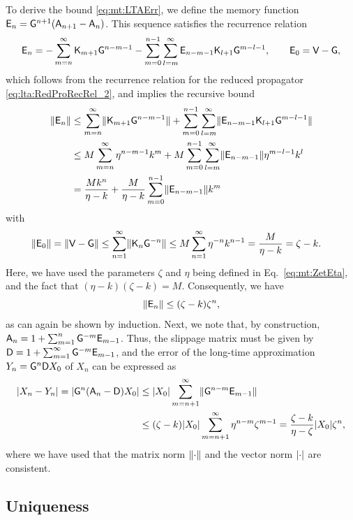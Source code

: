 \documentclass[aps,prl,reprint]{revtex4-2}
\begin{document}
To derive the bound \eqref{eq:mt:LTAErr}, we define the memory function $\mathsf{E}_n = \mathsf{G}^{n+1}(\mathsf{A}_{n+1} -\mathsf{A}_n)$.
This sequence satisfies the recurrence relation
\begin{equation}
\mathsf{E}_n =  - \sum_{m=n}^\infty\mathsf{K}_{m+1}\mathsf{G}^{n-m-1}
- \sum_{m=0}^{n-1}\sum_{l=m}^\infty\mathsf{E}_{n-m-1}\mathsf{K}_{l+1}\mathsf{G}^{m-l-1},
\qquad \mathsf{E}_0 = \mathsf{V} - \mathsf{G},
\end{equation}
which follows from the recurrence relation for the reduced propagator \eqref{eq:lta:RedProRecRel_2}, and implies the recursive bound
\begin{align}
\lVert \mathsf{E}_n \rVert & \leq \sum_{m=n}^\infty \lVert \mathsf{K}_{m+1}\mathsf{G}^{n-m-1} \rVert
+ \sum_{m=0}^{n-1}\sum_{l=m}^\infty\lVert \mathsf{E}_{n-m-1}\mathsf{K}_{l+1}\mathsf{G}^{m-l-1} \rVert\\
& \leq M\sum_{m=n}^\infty \eta^{n-m-1}k^m + M\sum_{m=0}^{n-1}\sum_{l=m}^\infty
\lVert \mathsf{E}_{n-m-1} \rVert\eta^{m-l-1}k^l\nonumber\\
&=\frac{Mk^n}{\eta-k} + \frac{M}{\eta-k}\sum_{m=0}^{n-1}\lVert \mathsf{E}_{n-m-1} \rVert k^m\nonumber
\end{align}
with
\begin{align}
\lVert \mathsf{E}_0 \rVert = \lVert \mathsf{V}-\mathsf{G} \rVert & \leq \sum_{n=1}^\infty\lVert \mathsf{K}_n\mathsf{G}^{-n} \rVert
\leq M \sum_{n=1}^\infty \eta^{-n}k^{n-1}
= \frac{M}{\eta-k}=\zeta- k.
\end{align}
Here, we have used the parameters $\zeta$ and $\eta$ being defined in Eq.~\eqref{eq:mt:ZetEta}, and the fact that $(\eta-k)(\zeta-k)=M$.
Consequently, we have
\begin{equation}\label{eq:eb:CMFBnd}
\lVert \mathsf{E}_n \rVert \leq (\zeta-k)\zeta^n,
\end{equation}
as can again be shown by induction.
Next, we note that, by construction, $\mathsf{A}_n = 1+\sum_{m=1}^n\mathsf{G}^{-m}\mathsf{E}_{m-1}$.
Thus, the slippage matrix must be given by $\mathsf{D}= 1+\sum_{m=1}^\infty\mathsf{G}^{-m}\mathsf{E}_{m-1}$, and the error of the long-time approximation $Y_n = \mathsf{G}^n\mathsf{D} X_0$ of $X_n$ can be expressed as
\begin{align}
\lvert X_n - Y_n \rvert = \lvert \mathsf{G}^n(\mathsf{A}_n - \mathsf{D})X_0 \rvert
& \leq \lvert X_0 \rvert\sum_{m=n+1}^\infty\lVert \mathsf{G}^{n-m}\mathsf{E}_{m-1} \rVert\\
& \leq (\zeta-k)\lvert X_0 \rvert\sum_{m=n+1}^\infty\eta^{n-m}\zeta^{m-1}
= \frac{\zeta-k}{\eta-\zeta}\lvert X_0 \rvert\zeta^n, \nonumber
\end{align}
where we have used that the matrix norm $\lVert \cdot \rVert$ and the vector norm $\lvert \cdot \rvert$ are consistent.

\subsection{Uniqueness}
\end{document}
